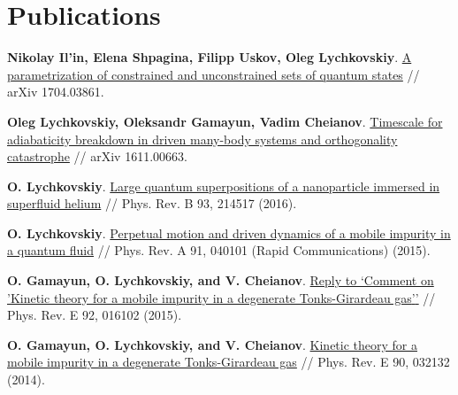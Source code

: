 \documentclass[10pt,a4paper,sans]{moderncv}
\begin{document}
	



	
	
\section{Publications}

	{\textbf{Nikolay Il'in, Elena Shpagina, Filipp Uskov, Oleg Lychkovskiy}.
	{\textcolor{blue}{\href{http://arxiv.org/abs/1704.03861}{A parametrization of constrained and unconstrained sets of quantum
  states}}} //  arXiv 1704.03861.}

	{\textbf{Oleg Lychkovskiy, Oleksandr Gamayun, Vadim Cheianov}.
	{\textcolor{blue}{\href{https://arxiv.org/abs/1611.00663}{Timescale for adiabaticity breakdown in driven many-body systems and orthogonality catastrophe}}} //  arXiv 1611.00663.}



	{\textbf{O. Lychkovskiy}.
	{\textcolor{blue}{\href{http://journals.aps.org/prb/abstract/10.1103/PhysRevB.93.214517}{Large quantum superpositions of a nanoparticle immersed in superfluid helium}}} //  Phys. Rev. B 93, 214517 (2016).}


	{\textbf{O. Lychkovskiy}.
	{\textcolor{blue}{\href{http://dx.doi.org/10.1103/PhysRevA.91.040101}{Perpetual motion and driven dynamics of a mobile impurity in a quantum fluid}}} //
	Phys. Rev. A 91, 040101 (Rapid Communications) (2015).}

	{\textbf{O. Gamayun, O. Lychkovskiy, and V. Cheianov}.
	{\textcolor{blue}{\href{http://dx.doi.org/10.1103/PhysRevE.92.016102}{Reply to `Comment on 'Kinetic theory for a mobile impurity in a degenerate Tonks-Girardeau gas{'}{'}}}} //
	Phys. Rev. E 92, 016102 (2015).}

	{\textbf{O. Gamayun, O. Lychkovskiy, and V. Cheianov}.
	{\textcolor{blue}{\href{http://dx.doi.org/10.1103/PhysRevE.90.032132}{Kinetic theory for a mobile impurity in a degenerate Tonks-Girardeau gas}}} //
	Phys. Rev. E 90, 032132 (2014).}
\end{document}

